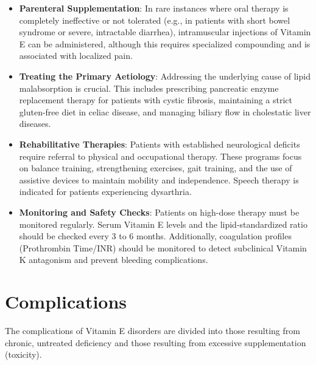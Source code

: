 \begin{itemize}
\begin{itemize}
    \end{itemize}
    \item \textbf{Parenteral Supplementation}: In rare instances where oral therapy is completely ineffective or not tolerated (e.g., in patients with short bowel syndrome or severe, intractable diarrhea), intramuscular injections of Vitamin E can be administered, although this requires specialized compounding and is associated with localized pain.
    \item \textbf{Treating the Primary Aetiology}: Addressing the underlying cause of lipid malabsorption is crucial. This includes prescribing pancreatic enzyme replacement therapy for patients with cystic fibrosis, maintaining a strict gluten-free diet in celiac disease, and managing biliary flow in cholestatic liver diseases.
    \item \textbf{Rehabilitative Therapies}: Patients with established neurological deficits require referral to physical and occupational therapy. These programs focus on balance training, strengthening exercises, gait training, and the use of assistive devices to maintain mobility and independence. Speech therapy is indicated for patients experiencing dysarthria.
    \item \textbf{Monitoring and Safety Checks}: Patients on high-dose therapy must be monitored regularly. Serum Vitamin E levels and the lipid-standardized ratio should be checked every 3 to 6 months. Additionally, coagulation profiles (Prothrombin Time/INR) should be monitored to detect subclinical Vitamin K antagonism and prevent bleeding complications.
\end{itemize}

\section*{Complications}
The complications of Vitamin E disorders are divided into those resulting from chronic, untreated deficiency and those resulting from excessive supplementation (toxicity).

